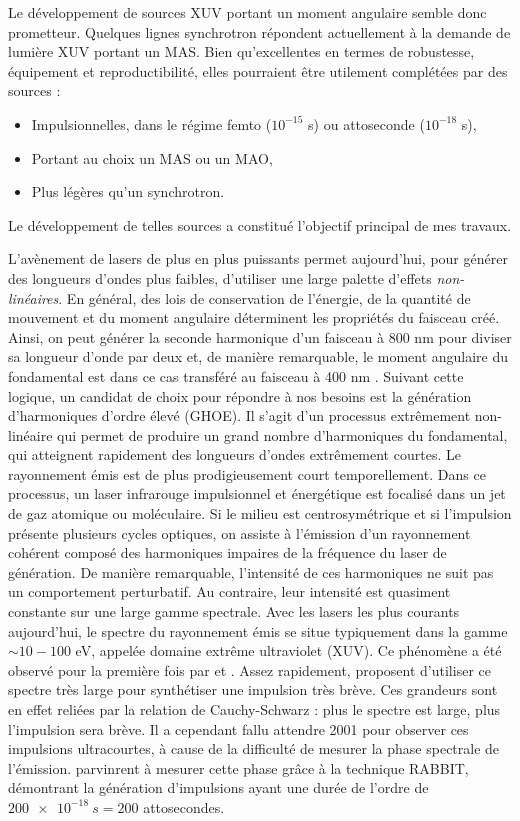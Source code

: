Le développement de sources XUV portant un moment angulaire semble donc prometteur. Quelques lignes synchrotron répondent actuellement à la demande de lumière XUV portant un MAS. Bien qu'excellentes en termes de robustesse, équipement et reproductibilité, elles pourraient être utilement complétées par des sources :
\begin{itemize}
\renewcommand{\labelitemi}{$\bullet$}
\setlength\itemsep{1em}
\item Impulsionnelles, dans le régime femto ($10^{-15}$ s) ou attoseconde ($10^{-18}$ s),
\item Portant au choix un MAS ou un MAO,
\item Plus légères qu'un synchrotron.
\end{itemize}
Le développement de telles sources a constitué l'objectif principal de mes travaux.

L'avènement de lasers de plus en plus puissants permet aujourd'hui, pour générer des longueurs d'ondes plus faibles, d'utiliser une large palette d'effets \textit{non-linéaires}. En général, des lois de conservation de l'énergie, de la quantité de mouvement et du moment angulaire déterminent les propriétés du faisceau créé. Ainsi, on peut générer la seconde harmonique d'un faisceau à 800 nm pour diviser sa longueur d'onde par deux et, de manière remarquable, le moment angulaire du fondamental est dans ce cas transféré au faisceau à 400 nm . Suivant cette logique, un candidat de choix pour répondre à nos besoins est la génération d'harmoniques d'ordre élevé (GHOE). Il s'agit d'un processus extrêmement non-linéaire qui permet de produire un grand nombre d'harmoniques du fondamental, qui atteignent rapidement des longueurs d'ondes extrêmement courtes. Le rayonnement émis est de plus prodigieusement court temporellement. Dans ce processus, un laser infrarouge impulsionnel et énergétique est focalisé dans un jet de gaz atomique ou moléculaire. Si le milieu est centrosymétrique et si l'impulsion présente plusieurs cycles optiques, on assiste à l'émission d'un rayonnement cohérent composé des harmoniques impaires de la fréquence du laser de génération. De manière remarquable, l'intensité de ces harmoniques ne suit pas un comportement perturbatif. Au contraire, leur intensité est quasiment constante sur une large gamme spectrale. Avec les lasers les plus courants aujourd'hui, le spectre du rayonnement émis se situe typiquement dans la gamme $\sim 10-100$ eV, appelée domaine extrême ultraviolet (XUV). Ce phénomène a été observé pour la première fois par  et . Assez rapidement,  proposent d'utiliser ce spectre très large pour synthétiser une impulsion très brève. Ces grandeurs sont en effet reliées par la relation de Cauchy-Schwarz : plus le spectre est large, plus l'impulsion sera brève. Il a cependant fallu attendre 2001 pour observer ces impulsions ultracourtes, à cause de la difficulté de mesurer la phase spectrale de l'émission.  parvinrent à mesurer cette phase grâce à la technique RABBIT, démontrant la génération d'impulsions ayant une durée de l'ordre de $\SI{200e-18}{s} = 200$ attosecondes. 


